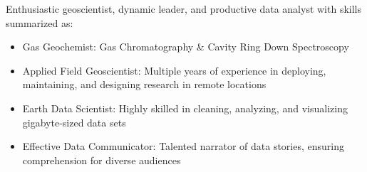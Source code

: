 %
%
%
\par{Enthusiastic geoscientist, dynamic leader, and productive data analyst with skills summarized as:
\begin{itemize}
    \item Gas Geochemist: Gas Chromatography \& Cavity Ring Down Spectroscopy
    \item Applied Field Geoscientist: Multiple years of experience in deploying, maintaining, and designing research in remote locations
    \item Earth Data Scientist: Highly skilled in cleaning, analyzing, and visualizing gigabyte-sized data sets
    \item Effective Data Communicator: Talented narrator of data stories, ensuring comprehension for diverse audiences
\end{itemize}
}